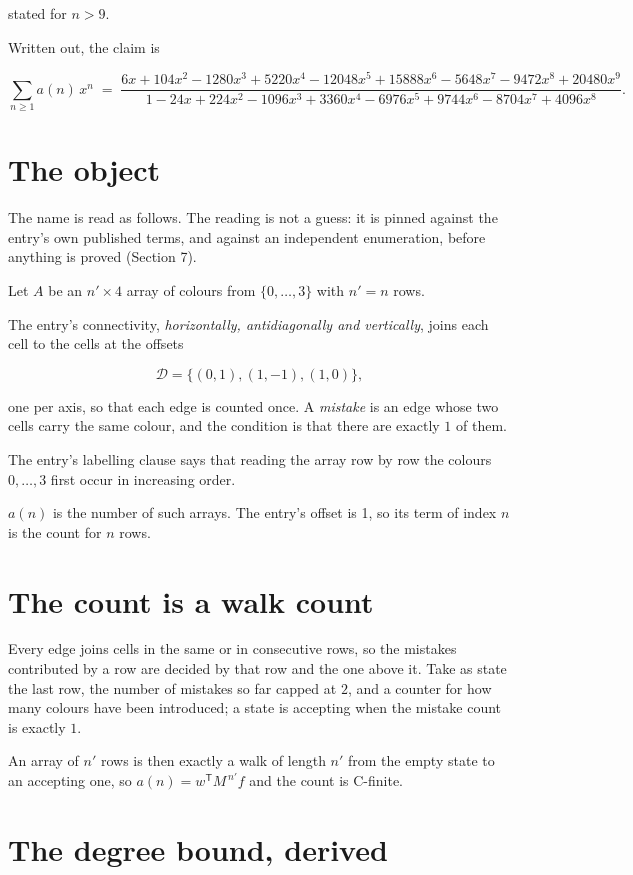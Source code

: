 \documentclass[11pt]{article}
\theoremstyle{definition}
\begin{document}
stated for $n > 9$.

Written out, the claim is

\[\sum_{n \ge 1} a(n)\,x^n \;=\; \frac{6x + 104x^{2} - 1280x^{3} + 5220x^{4} - 12048x^{5} + 15888x^{6} - 5648x^{7} - 9472x^{8} + 20480x^{9}}{1 - 24x + 224x^{2} - 1096x^{3} + 3360x^{4} - 6976x^{5} + 9744x^{6} - 8704x^{7} + 4096x^{8}}.\]

\section{The object}

The name is read as follows. The reading is not a guess: it is pinned against the entry's own published terms, and against an independent enumeration, before anything is proved (Section 7).

Let $A$ be an $n' \times 4$ array of colours from $\{0,\dots,3\}$ with $n' = n$ rows.

The entry's connectivity, {\itshape horizontally, antidiagonally and vertically}, joins each cell to the cells at the offsets

\[\mathcal{D} = \{(0,1), (1,-1), (1,0)\},\]

one per axis, so that each edge is counted once. A {\itshape mistake} is an edge whose two cells carry the same colour, and the condition is that there are exactly $1$ of them.

The entry's labelling clause says that reading the array row by row the colours $0,\dots,3$ first occur in increasing order.

$a(n)$ is the number of such arrays. The entry's offset is 1, so its term of index $n$ is the count for $n$ rows.

\section{The count is a walk count}

Every edge joins cells in the same or in consecutive rows, so the mistakes contributed by a row are decided by that row and the one above it. Take as state the last row, the number of mistakes so far capped at $2$, and a counter for how many colours have been introduced; a state is accepting when the mistake count is exactly $1$.

An array of $n'$ rows is then exactly a walk of length $n'$ from the empty state to an accepting one, so $a(n) = w^{\mathsf T}M^{\,n'}f$ and the count is C-finite.

\section{The degree bound, derived}
\end{document}
